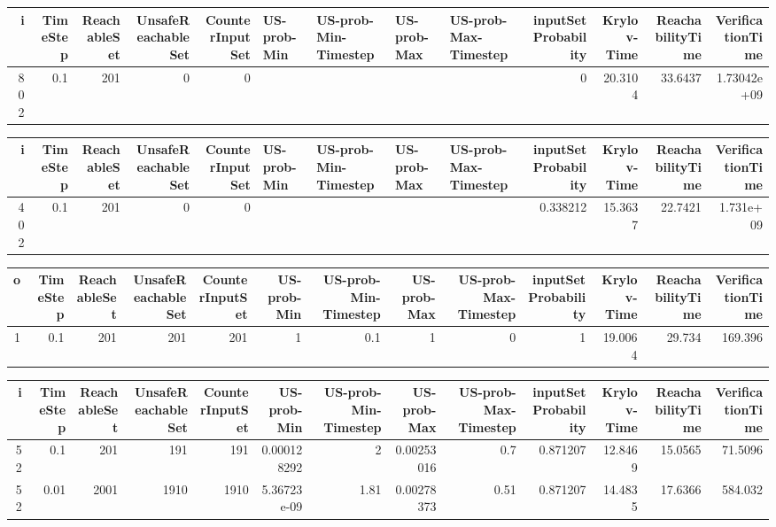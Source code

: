 \begin{tabular}{rrrrrllllrrrr}
\hline
   i &   TimeStep &   ReachableSet &   UnsafeReachableSet &   CounterInputSet & US-prob-Min   & US-prob-Min-Timestep   & US-prob-Max   & US-prob-Max-Timestep   &   inputSet Probability &   Krylov-Time &   ReachabilityTime &   VerificationTime \\
\hline
 802 &        0.1 &            201 &                    0 &                 0 &               &                        &               &                        &                      0 &       20.3104 &            33.6437 &        1.73042e+09 \\
\hline
\end{tabular}
\begin{tabular}{rrrrrllllrrrr}
\hline
   i &   TimeStep &   ReachableSet &   UnsafeReachableSet &   CounterInputSet & US-prob-Min   & US-prob-Min-Timestep   & US-prob-Max   & US-prob-Max-Timestep   &   inputSet Probability &   Krylov-Time &   ReachabilityTime &   VerificationTime \\
\hline
 402 &        0.1 &            201 &                    0 &                 0 &               &                        &               &                        &               0.338212 &       15.3637 &            22.7421 &          1.731e+09 \\
\hline
\end{tabular}
\begin{tabular}{rrrrrrrrrrrrr}
\hline
   o &   TimeStep &   ReachableSet &   UnsafeReachableSet &   CounterInputSet &   US-prob-Min &   US-prob-Min-Timestep &   US-prob-Max &   US-prob-Max-Timestep &   inputSet Probability &   Krylov-Time &   ReachabilityTime &   VerificationTime \\
\hline
   1 &        0.1 &            201 &                  201 &               201 &             1 &                    0.1 &             1 &                      0 &                      1 &       19.0064 &             29.734 &            169.396 \\
\hline
\end{tabular}
\begin{tabular}{rrrrrrrrrrrrr}
\hline
   i &   TimeStep &   ReachableSet &   UnsafeReachableSet &   CounterInputSet &   US-prob-Min &   US-prob-Min-Timestep &   US-prob-Max &   US-prob-Max-Timestep &   inputSet Probability &   Krylov-Time &   ReachabilityTime &   VerificationTime \\
\hline
  52 &       0.1  &            201 &                  191 &               191 &   0.000128292 &                   2    &    0.00253016 &                   0.7  &               0.871207 &       12.8469 &            15.0565 &            71.5096 \\
  52 &       0.01 &           2001 &                 1910 &              1910 &   5.36723e-09 &                   1.81 &    0.00278373 &                   0.51 &               0.871207 &       14.4835 &            17.6366 &           584.032  \\
\hline
\end{tabular}
